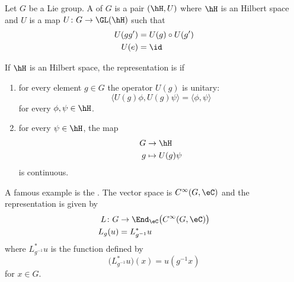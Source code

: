 Let $G$ be a Lie group. A  of $G$ is a pair $(\hH,U)$ where $\hH$ is an Hilbert space and $U$ is a map $U\colon G\to \GL(\hH)$ such that
\begin{equation}
	\begin{aligned}[]
		U(gg') & =U(g)\circ U(g') \\
		U(e)   & =\id
	\end{aligned}
\end{equation}

\begin{definition}
	If $\hH$ is an Hilbert space, the representation is  if
	\begin{enumerate}

		\item
		      for every element $g\in G$ the operator $U(g)$ is unitary:
		      \begin{equation}
			      \langle U(g)\phi, U(g)\psi\rangle =\langle \phi, \psi\rangle
		      \end{equation}
		      for every $\phi,\psi\in\hH$.

		\item
		      for every $\psi\in\hH$, the map
		      \begin{equation}
			      \begin{aligned}
				      G & \to \hH          \\
				      g & \mapsto U(g)\psi
			      \end{aligned}
		      \end{equation}
		      is continuous.
	\end{enumerate}
\end{definition}

A famous example is the . The vector space is $ C^{\infty}(G,\eC)$ and the representation is given by
\begin{equation}
	\begin{aligned}
		L\colon G & \to \End_{\eC}\big(  C^{\infty}(G,\eC) \big) \\
		L_g(u)    & =L_{g^{-1}}^*u
	\end{aligned}
\end{equation}
where $L_{g^{-1}}^*u$ is the function defined by
\begin{equation}
	\big(  L^*_{g^{-1}}u  \big)(x)=u(g^{-1}x)
\end{equation}
for $x\in G$.


